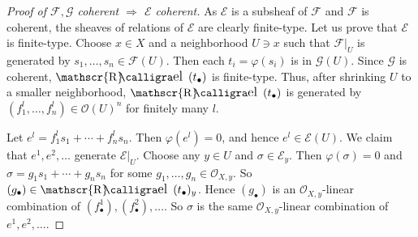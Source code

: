 \documentclass[12pt,b5paper,notitlepage]{report}
\theoremstyle{definition}
\theoremstyle{plain}
\DeclareMathOperator{\Rel}{\mathscr{R}\text{\kern -3pt {\calligra\large el}~}\,}
\newcommand{\scr}{\mathscr}
\newcommand{\blt}{\bullet}
\numberwithin{equation}{section}
\begin{document}
\begin{proof}[Proof of $\scr F,\scr G$ coherent $\Rightarrow$ $\scr E$ coherent]
As $\scr E$ is a subsheaf of $\scr F$ and $\scr F$ is coherent, the sheaves of relations of $\scr E$ are clearly finite-type. Let us prove that $\scr E$ is finite-type. Choose $x\in X$ and a neighborhood $U\ni x$ such that $\scr F|_U$ is generated by $s_1,\dots,s_n\in\scr F(U)$. Then each $t_i=\varphi(s_i)$ is in $\scr G(U)$. Since $\scr G$ is coherent, $\Rel(t_\blt)$ is finite-type. Thus, after shrinking $U$ to a smaller neighborhood, $\Rel(t_\blt)$ is generated by $(f_1^l,\dots,f_n^l)\in\scr O(U)^n$ for finitely many $l$.

Let $e^l=f_1^ls_1+\cdots+f_n^ls_n$. Then $\varphi(e^l)=0$, and hence $e^l\in\scr E(U)$. We claim that $e^1,e^2,\dots$ generate $\scr E|_U$. Choose any $y\in U$ and $\sigma\in\scr E_y$. Then $\varphi(\sigma)=0$ and $\sigma=g_1s_1+\cdots+g_ns_n$ for some $g_1,\dots,g_n\in\scr O_{X,y}$. So $(g_\blt)\in\Rel(t_\blt)_y$. Hence $(g_\blt)$ is an $\scr O_{X,y}$-linear combination of $(f_\blt^1),(f_\blt^2),\dots$. So $\sigma$ is the same $\scr O_{X,y}$-linear combination of $e^1,e^2,\dots$.
\end{proof}
\end{document}
